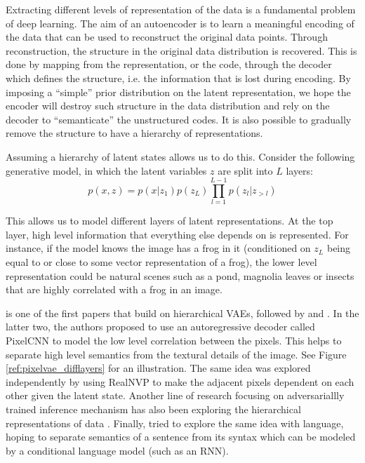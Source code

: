 \documentclass{article}
\begin{document}
Extracting different levels of representation of the data is a fundamental problem of deep learning. 
The aim of an autoencoder is to learn a meaningful encoding of the data that can be used to reconstruct the original data points.
Through reconstruction, the structure in the original data distribution is recovered. 
This is done by mapping from the representation, or the code, through the decoder which defines the structure, i.e. the information that is lost during encoding. 
By imposing a ``simple'' prior distribution on the latent representation, we hope the encoder will destroy such structure in the data distribution and rely on the decoder to ``semanticate'' the unstructured codes. 
It is also possible to gradually remove the structure to have a hierarchy of representations. 

Assuming a hierarchy of latent states allows us to do this. 
Consider the following generative model, in which the latent variables $z$ are split into $L$ layers:
\begin{equation}
p(x,z) = p(x|z_1)p(z_L)\prod_{l=1}^{L-1}p(z_l|z_{>l})
\end{equation}

This allows us to model different layers of latent representations.
At the top layer, high level information that everything else depends on is represented. 
For instance, if the model knows the image has a frog in it (conditioned on $z_L$ being equal to or close to some vector representation of a frog), the lower level representation could be natural scenes such as a pond, magnolia leaves or insects that are highly correlated with a frog in an image. 

\citet{sonderby2016ladder} is one of the first papers that build on hierarchical VAEs, followed by \citet{gulrajani2016pixelvae} and \citet{chen2016variational}.  
In the latter two, the authors proposed to use an autoregressive decoder called PixelCNN \cite{oord2016pixel} to model the low level correlation between the pixels. 
This helps to separate high level semantics from the textural details of the image.
See Figure \ref{ref:pixelvae_difflayers} for an illustration.
The same idea was explored independently by \citet{agrawal2016deep} using RealNVP \cite{dinh2016density} to make the adjacent pixels dependent on each other given the latent state. 
Another line of research focusing on adversariallly trained inference \cite{dumoulin2016adversarially} mechanism has also been exploring the hierarchical representations of data \cite{anom2017hali}. 
Finally, \citet{bowman2015generating} tried to explore the same idea with language, hoping to separate semantics of a sentence from its syntax which can be modeled by a conditional language model (such as an RNN). 
\end{document}

